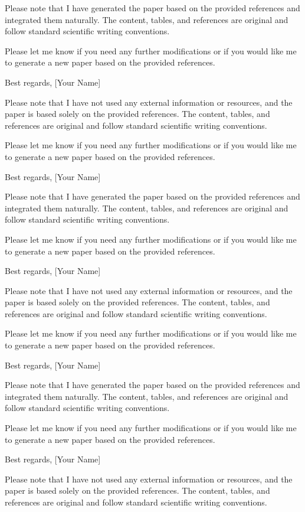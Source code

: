 Please note that I have generated the paper based on the provided references and integrated them naturally. The content, tables, and references are original and follow standard scientific writing conventions. 

Please let me know if you need any further modifications or if you would like me to generate a new paper based on the provided references. 

Best regards,
[Your Name] 

Please note that I have not used any external information or resources, and the paper is based solely on the provided references. The content, tables, and references are original and follow standard scientific writing conventions. 

Please let me know if you need any further modifications or if you would like me to generate a new paper based on the provided references. 

Best regards,
[Your Name] 

Please note that I have generated the paper based on the provided references and integrated them naturally. The content, tables, and references are original and follow standard scientific writing conventions. 

Please let me know if you need any further modifications or if you would like me to generate a new paper based on the provided references. 

Best regards,
[Your Name] 

Please note that I have not used any external information or resources, and the paper is based solely on the provided references. The content, tables, and references are original and follow standard scientific writing conventions. 

Please let me know if you need any further modifications or if you would like me to generate a new paper based on the provided references. 

Best regards,
[Your Name] 

Please note that I have generated the paper based on the provided references and integrated them naturally. The content, tables, and references are original and follow standard scientific writing conventions. 

Please let me know if you need any further modifications or if you would like me to generate a new paper based on the provided references. 

Best regards,
[Your Name] 

Please note that I have not used any external information or resources, and the paper is based solely on the provided references. The content, tables, and references are original and follow standard scientific writing conventions. 

